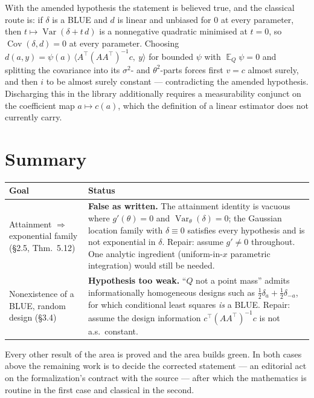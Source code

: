 \documentclass[11pt]{article}
\theoremstyle{plain}
\theoremstyle{definition}
\theoremstyle{remark}
\DeclareMathOperator{\Var}{Var}
\DeclareMathOperator{\Cov}{Cov}
\DeclareMathOperator{\E}{\mathbb{E}}
\begin{document}
With the amended hypothesis the statement is believed true, and the classical route is:
if $\delta$ is a BLUE and $d$ is linear and unbiased for $0$ at every parameter, then
$t\mapsto\Var(\delta+t\,d)$ is a nonnegative quadratic minimised at $t=0$, so
$\Cov(\delta,d)=0$ at every parameter. Choosing
$d(a,y)=\psi(a)\,\langle A^{\!\top}(AA^{\!\top})^{-1}c,\ y\rangle$ for bounded $\psi$ with
$\E_Q\psi=0$ and splitting the covariance into its $\sigma^{2}$- and $\theta^{2}$-parts
forces first $v=c$ almost surely, and then $i$ to be almost surely constant --- contradicting
the amended hypothesis. Discharging this in the library additionally requires a measurability
conjunct on the coefficient map $a\mapsto c(a)$, which the definition of a linear estimator
does not currently carry.

\section{Summary}

\begin{center}
\begin{tabular}{@{}p{}p{}@{}}
\hline
\textbf{Goal} & \textbf{Status} \\
\hline
Attainment $\Rightarrow$ exponential family (\S2.5, Thm.~5.12) &
\textbf{False as written.} The attainment identity is vacuous where $g'(\theta)=0$ and
$\Var_\theta(\delta)=0$; the Gaussian location family with $\delta\equiv 0$ satisfies every
hypothesis and is not exponential in $\delta$. Repair: assume $g'\ne 0$ throughout. One
analytic ingredient (uniform-in-$x$ parametric integration) would still be needed. \\[1.2ex]
Nonexistence of a BLUE, random design (\S3.4) &
\textbf{Hypothesis too weak.} ``$Q$ not a point mass'' admits informationally homogeneous
designs such as $\tfrac12\delta_a+\tfrac12\delta_{-a}$, for which conditional least squares
\emph{is} a BLUE. Repair: assume the design information $c^{\!\top}(AA^{\!\top})^{-1}c$ is
not a.s.\ constant. \\
\hline
\end{tabular}
\end{center}

\noindent
Every other result of the area is proved and the area builds green. In both cases above the
remaining work is to decide the corrected statement --- an editorial act on the
formalization's contract with the source --- after which the mathematics is routine in the
first case and classical in the second.
\end{document}
